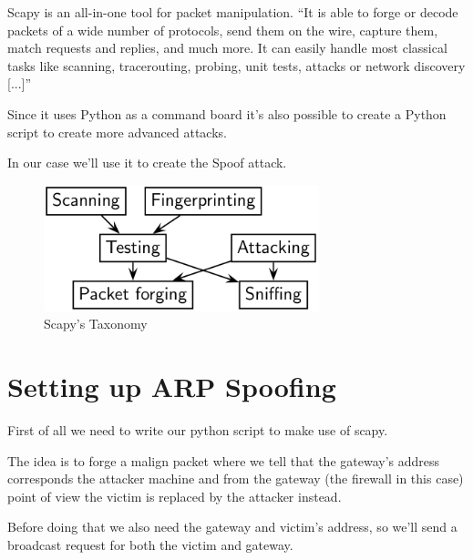 Scapy is an all-in-one tool for packet manipulation.
``It is able to forge or decode packets of a wide number of protocols, send them on the wire, capture them, match requests and replies, and much more. It can easily handle most classical tasks like scanning, tracerouting, probing, unit tests, attacks or network discovery [...]''\cite{scapy}

Since it uses Python as a command board it's also possible to create a Python script to create more advanced attacks.

In our case we'll use it to create the  Spoof attack.

\begin{figure}[h!]
 \centering
 \includegraphics[width=8cm]{img/testing-taxonomy.png}
 \caption{Scapy's Taxonomy}
 \label{fig: scapy taxonomy}
\end{figure}


\newpage

\section{Setting up ARP Spoofing}

First of all we need to write our python script to make use of scapy.

The idea is to forge a malign  packet where we tell that the gateway's  address corresponds the attacker machine and from the gateway (the firewall in this case) point of view the victim is replaced by the attacker instead.

Before doing that we also need the gateway and victim's  address, so we'll send a broadcast  request for both the victim and gateway.

